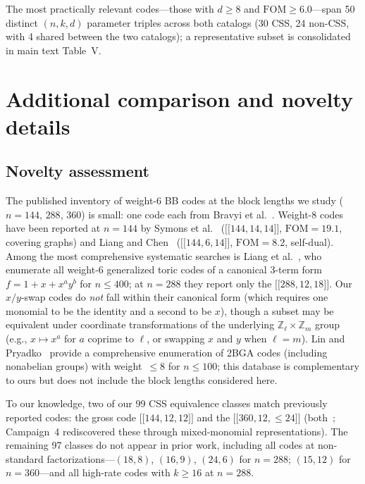 \documentclass[aps,prxquantum,twocolumn,superscriptaddress,nofootinbib]{revtex4-2}
\newcommand{\ZZ}{\ensuremath{\mathbb{Z}}}
\newcommand{\dblbrk}[1]{\ensuremath{\lbrack\!\lbrack #1 \rbrack\!\rbrack}}
\newcommand{\code}[1]{\dblbrk{#1}}
\newcommand{\FOM}{\ensuremath{\mathrm{FOM}}}
\begin{document}
The most practically relevant codes---those with $d \geq 8$ and $\FOM \geq 6.0$---span 50 distinct $(n,k,d)$ parameter triples across both catalogs (30 CSS, 24 non-CSS, with 4 shared between the two catalogs); a representative subset is consolidated in main text Table~V.

\section{Additional comparison and novelty details}
\label{sm:comparison}

\subsection{Novelty assessment}
\label{sm:novelty}

The published inventory of weight-6 BB codes at the block lengths we study ($n = 144$, $288$, $360$) is small: one code each from Bravyi et al.~\cite{bravyi2024high}.
Weight-8 codes have been reported at $n = 144$ by Symons et al.~\cite{symons2025covering} ($\code{144,14,14}$, $\FOM = 19.1$, covering graphs) and Liang and Chen~\cite{liang2025selfdual} ($\code{144,6,14}$, $\FOM = 8.2$, self-dual).
Among the most comprehensive systematic searches is Liang et al.~\cite{liang2025generalized}, who enumerate all weight-6 generalized toric codes of a canonical 3-term form $f = 1{+}x{+}x^a y^b$ for $n \leq 400$; at $n = 288$ they report only the $\code{288,12,18}$.
Our $x/y$-swap codes do \emph{not} fall within their canonical form (which requires one monomial to be the identity and a second to be $x$), though a subset may be equivalent under coordinate transformations of the underlying $\ZZ_\ell \times \ZZ_m$ group (e.g., $x \mapsto x^a$ for $a$ coprime to $\ell$, or swapping $x$ and $y$ when $\ell = m$).
Lin and Pryadko~\cite{lin2024abelian} provide a comprehensive enumeration of 2BGA codes (including nonabelian groups) with weight~$\leq 8$ for $n \leq 100$; this database is complementary to ours but does not include the block lengths considered here.

To our knowledge, two of our 99 CSS equivalence classes match previously reported codes: the gross code $\code{144,12,12}$ and the $\code{360,12,{\leq}24}$ (both~\cite{bravyi2024high}; Campaign~4 rediscovered these through mixed-monomial representations).
The remaining 97 classes do not appear in prior work, including all codes at non-standard factorizations---$(18,8)$, $(16,9)$, $(24,6)$ for $n = 288$; $(15,12)$ for $n = 360$---and all high-rate codes with $k \geq 16$ at $n = 288$.
\end{document}
